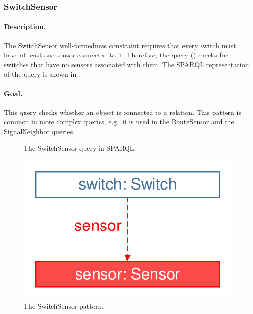 \subsubsection{SwitchSensor}

\paragraph{Description.} The \textsf{SwitchSensor} well-formedness constraint requires that every switch must have at least one sensor connected to it. Therefore, the query () checks for switches that have no sensors associated with them. The SPARQL representation of the query is shown in .

\paragraph{Goal.} This query checks whether an object is connected to a relation. This pattern is common in more complex queries, e.g.\ it is used in the \textsf{RouteSensor} and the \textsf{SignalNeighbor} queries.

\begin{figure}[htb]
\centering
\begin{minipage}{0.6\textwidth}
  { \alignListing
    }
  \caption{The \textsf{SwitchSensor} query in SPARQL.}
  \label{lst:switchsensor-sparql}
\end{minipage}
\end{figure}


\begin{figure}[htb]
	\centering
	\includegraphics[scale=0.4]{figures/trainbenchmark-switchsensor}
	\caption{The \textsf{SwitchSensor} pattern.}
	\label{fig:trainbenchmark-switchsensor}
\end{figure}

